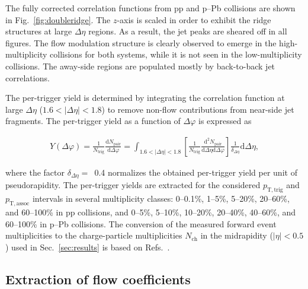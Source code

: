 The fully corrected correlation functions from pp and p--Pb collisions are shown in Fig.~\ref{fig:doubleridge}. 
The $z$-axis is scaled in order to exhibit the ridge structures at large $\Delta\eta$ regions. As a result, the jet peaks are sheared off in all figures. The flow modulation structure is clearly observed to emerge in the high-multiplicity collisions for both systems, while it is not seen in the low-multiplicity collisions. The away-side regions are populated mostly by back-to-back jet correlations. 

The per-trigger yield is determined by integrating the correlation function at large $\Delta\eta$ ($1.6<|\Delta\eta|<1.8$) to remove non-flow contributions from near-side jet fragments.
The per-trigger yield as a function of $\Delta\varphi$ is expressed as

\begin{eqnarray}
Y(\Delta\varphi) = \frac{1}{N_{\mathrm{trig}}} \frac{\mathrm{d} N_{\mathrm{pair}}}{\mathrm{d}\Delta\varphi} = \int_{1.6<|\Delta \eta|<1.8} \left[\frac{1}{N_{\mathrm{trig}}} \frac{\mathrm{d}^{2}N_{\mathrm{pair}}}{\mathrm{d}\Delta\eta \mathrm{d}\Delta\varphi}\right] \frac{1}{\delta_{\Delta\eta}} \mathrm{d}\Delta \eta,
\label{eq:pertrigger}
\end{eqnarray}

where the factor $\delta_{\Delta\eta}=$~0.4 normalizes the obtained per-trigger yield per unit of pseudorapidity.
The per-trigger yields are extracted for the considered $p_{\mathrm{T,trig}}$ and $p_{\mathrm{T,assoc}}$ intervals in several multiplicity classes: 0--0.1\%, 1--5\%, 5--20\%, 20--60\%, and 60--100\% in pp collisions, and 0--5\%, 5--10\%, 10--20\%, 20--40\%, 40--60\%, and 60--100\% in p--Pb collisions. The conversion of the measured forward event multiplicities to the charge-particle multiplicities $N_{\mathrm{ch}}$ in the midrapidity ($|\eta|<0.5$) used in Sec.~\ref{sec:results} is based on Refs.~\cite{ALICE:2020swj}.

\subsection{Extraction of flow coefficients}

